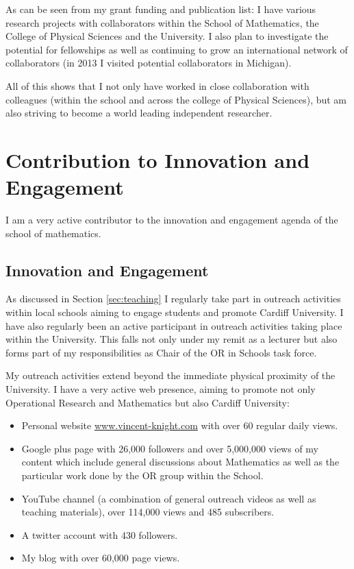 \documentclass{article}
\begin{document}
As can be seen from my grant funding and publication list: I have various research projects with collaborators within the School of Mathematics, the College of Physical Sciences and the University.
I also plan to investigate the potential for fellowships as well as continuing to grow an international network of collaborators (in 2013 I visited potential collaborators in Michigan).

All of this shows that I not only have worked in close collaboration with colleagues (within the school and across the college of Physical Sciences), but am also striving to become a world leading independent researcher.

\section{Contribution to Innovation and Engagement}\label{sec:innovation}

I am a very active contributor to the innovation and engagement agenda of the school of mathematics.

\subsection{Innovation and Engagement}

As discussed in Section \ref{sec:teaching} I regularly take part in outreach activities within local schools aiming to engage students and promote Cardiff University.
I have also regularly been an active participant in outreach activities taking place within the University.
This falls not only under my remit as a lecturer but also forms part of my responsibilities as Chair of the OR in Schools task force.

My outreach activities extend beyond the immediate physical proximity of the University. I have a very active web presence, aiming to promote not only Operational Research and Mathematics but also Cardiff University:

\begin{itemize}
    \item Personal website \url{www.vincent-knight.com} with over 60 regular daily views.
    \item Google plus page with 26,000 followers and over 5,000,000 views of my content which include general discussions about Mathematics as well as the particular work done by the OR group within the School.
    \item YouTube channel (a combination of general outreach videos as well as teaching materials), over 114,000 views and 485 subscribers.
    \item A twitter account with 430 followers.
    \item My blog with over 60,000 page views.
\end{itemize}
\end{document}
